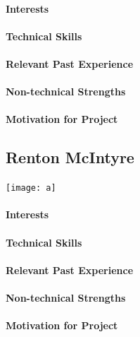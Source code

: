 \documentclass[12pt]{article}
\begin{document}
\paragraph{Interests}
\paragraph{Technical Skills}
\paragraph{Relevant Past Experience}
\paragraph{Non-technical Strengths}
\paragraph{Motivation for Project}

\subsection{Renton McIntyre}
\texttt{[image: a]}
\paragraph{Interests}
\paragraph{Technical Skills}
\paragraph{Relevant Past Experience}
\paragraph{Non-technical Strengths}
\paragraph{Motivation for Project}
\end{document}
